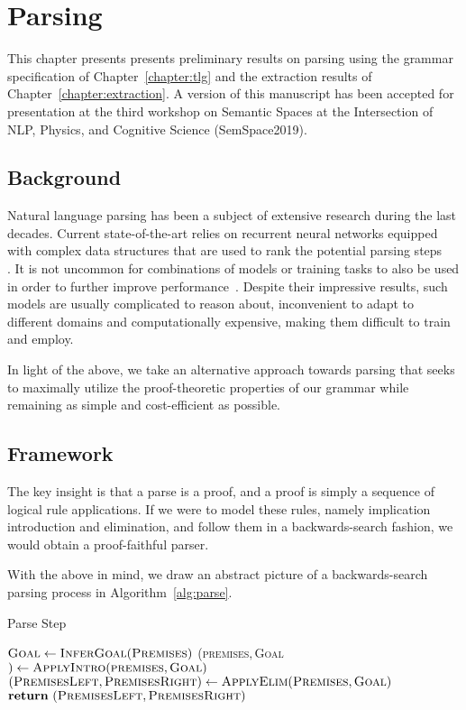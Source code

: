 \chapter{Parsing}
\label{chapter:parsing}

This chapter presents presents preliminary results on parsing using the grammar specification of Chapter~\ref{chapter:tlg} and the extraction results of Chapter~\ref{chapter:extraction}.
A version of this manuscript has been accepted for presentation at the third workshop on Semantic Spaces at the Intersection of NLP, Physics, and Cognitive Science (SemSpace2019).

\section{Background}
Natural language parsing has been a subject of extensive research during the last decades.
Current state-of-the-art relies on recurrent neural networks equipped with complex data structures that are used to rank the potential parsing steps~\\\cite{dyer-etal-2016-recurrent, dozat2016deep, liu-zhang-2017-order}.
It is not uncommon for combinations of models or training tasks to also be used in order to further improve performance~\cite{clark2018semi, fried2017improving}.
Despite their impressive results, such models are usually complicated to reason about, inconvenient to adapt to different domains and computationally expensive, making them difficult to train and employ.

In light of the above, we take an alternative approach towards parsing that seeks to maximally utilize the proof-theoretic properties of our grammar while remaining as simple and cost-efficient as possible.

\section{Framework}
The key insight is that a parse is a proof, and a proof is simply a sequence of logical rule applications.
If we were to model these rules, namely implication introduction and elimination, and follow them in a backwards-search fashion, we would obtain a proof-faithful parser.

With the above in mind, we draw an abstract picture of a backwards-search parsing process in Algorithm~\ref{alg:parse}.

\begin{algorithm}{
\caption{Parse Step}\label{alg:parse}
\begin{algorithmic}[1]
    \State $\textsc{Goal}\gets \textsc{InferGoal}(\textsc{Premises})$
        \State (\textsc{premises}$, $\textsc{Goal}$) \gets \textsc{ApplyIntro}(\textsc{premises}, \textsc{Goal})$
    \EndWhile
    \State $(\textsc{PremisesLeft}, \textsc{PremisesRight}) \gets \textsc{ApplyElim}(\textsc{Premises}, \textsc{Goal})$
    \State $\textbf{return} \ (\textsc{PremisesLeft}, \textsc{PremisesRight})$
\EndProcedure
\end{algorithmic}
}
\end{algorithm}


